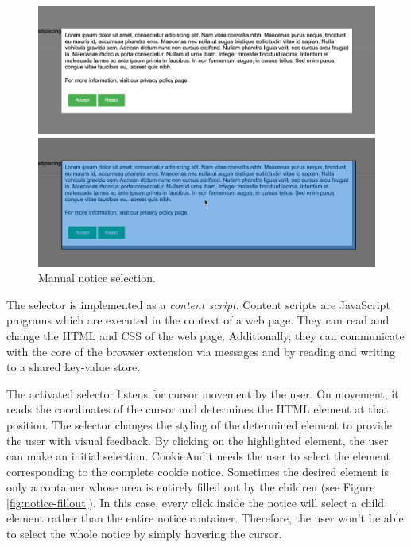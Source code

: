 \begin{figure}
	\centering
	\begin{minipage}{0.48\textwidth}
		\centering
		\includegraphics[width=1.0\linewidth]{media/screenshot_unselected.png}
	\end{minipage}\hfill
	\begin{minipage}{0.48\textwidth}
		\centering
		\includegraphics[width=1.0\linewidth]{media/screenshot_selected.png}      
	\end{minipage}
	\caption{Manual notice selection.}
	\label{fig:screenshot-selection}
\end{figure}

The selector is implemented as a \emph{content script}. Content scripts are JavaScript programs which are executed in the context of a web page. 
They can read and change the HTML and CSS of the web page. 
Additionally, they can communicate with the core of the browser extension via messages and by reading and writing to a shared key-value store.

The activated selector listens for cursor movement by the user. 
On movement, it reads the coordinates of the cursor and determines the HTML element at that position.
The selector changes the styling of the determined element to provide the user with visual feedback.
By clicking on the highlighted element, the user can make an initial selection.
CookieAudit needs the user to select the element corresponding to the complete cookie notice. 
Sometimes the desired element is only a container whose area is entirely filled out by the children (see Figure \ref{fig:notice-fillout}).
In this case, every click inside the notice will select a child element rather than the entire notice container. 
Therefore, the user won't be able to select the whole notice by simply hovering the cursor.

